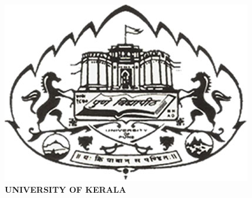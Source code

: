 \begin{center}
\includegraphics[scale=3.0]{project/images/uop-logo}\\
\LARGE{\textbf{UNIVERSITY OF KERALA}}
\newpage

\end{center}